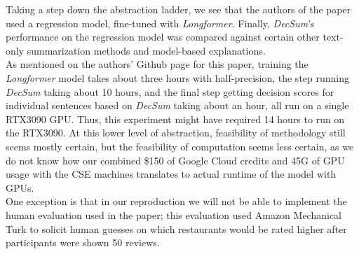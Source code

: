 \documentclass{article}
\begin{document}
    Taking a step down the abstraction ladder, we see that the authors of the paper used a regression model, fine-tuned with \textit{Longformer}. Finally, \textit{DecSum}'s performance
    on the regression model was compared against certain other text-only summarization methods and model-based explanations. \\

    As mentioned on the authors' Github page for this paper, training the \textit{Longformer} model takes about three hours with half-precision, the step
    running \textit{DecSum} taking about 10 hours, and the final step getting decision scores for individual sentences based on \textit{DecSum} taking about an hour, all run on a single
    RTX3090 GPU. Thus, this experiment might have required 14 hours to run on the RTX3090. At this lower level of abstraction, feasibility of methodology still seems mostly certain, but
    the feasibility of computation seems less certain, as we do not know how our combined \$150 of Google Cloud credits and 45G of GPU usage with the CSE machines translates to actual
    runtime of the model with GPUs. \\

    One exception is that in our reproduction we will not be able to implement the human evaluation used in the paper; this evaluation used Amazon Mechanical Turk to solicit
    human guesses on which restaurants would be rated higher after participants were shown 50 reviews.

    
\end{document}
